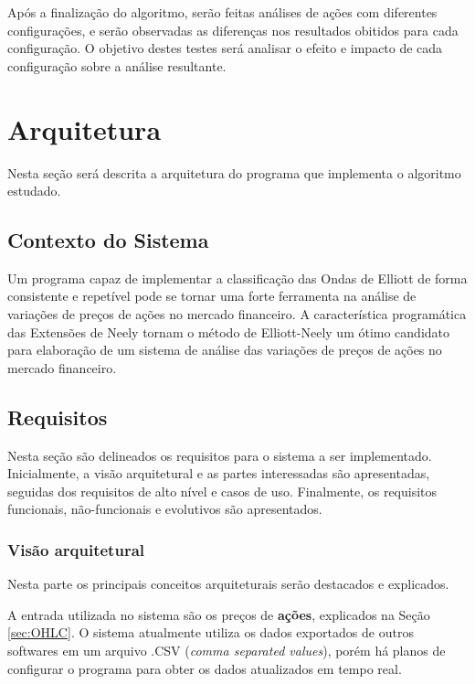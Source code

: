 \documentclass[12pt]{article}
\begin{document}
Após a finalização do algoritmo, serão feitas análises de ações com diferentes configurações,
e serão observadas as diferenças nos resultados obitidos para cada configuração.
O objetivo destes testes será analisar o efeito e impacto de cada configuração sobre a
análise resultante.

\newpage

\section{Arquitetura}

Nesta seção será descrita a arquitetura do programa que implementa o algoritmo estudado.

\subsection{Contexto do Sistema}

Um programa capaz de implementar a classificação das Ondas de Elliott de forma consistente
e repetível pode se tornar uma forte ferramenta na análise de variações de preços de ações
no mercado financeiro. A característica programática das Extensões de Neely tornam o método
de Elliott-Neely um ótimo candidato para elaboração de um sistema de análise das
variações de preços de ações no mercado financeiro.

\subsection{Requisitos}

Nesta seção são delineados os requisitos para o sistema a ser implementado.
Inicialmente, a visão arquitetural e as partes interessadas são apresentadas, seguidas dos
requisitos de alto nível e casos de uso. Finalmente, os requisitos funcionais,
não-funcionais e evolutivos são apresentados.

\subsubsection{Visão arquitetural}

Nesta parte os principais conceitos arquiteturais serão destacados e explicados.

A entrada utilizada no sistema são os preços de \textbf{ações}, explicados na Seção
\ref{sec:OHLC}. O sistema atualmente utiliza os dados exportados de outros softwares
em um arquivo .CSV (\textit{comma separated values}), porém há planos de configurar
o programa para obter os dados atualizados em tempo real.
\end{document}
